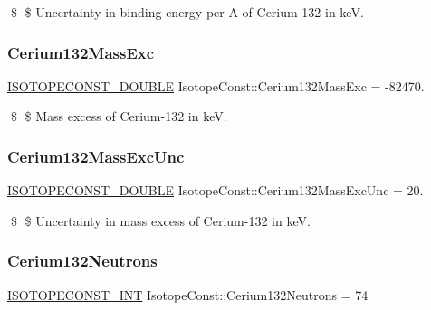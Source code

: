 \$ \$ Uncertainty in binding energy per A of Cerium-\/132 in keV. \mbox{\label{group___isotope_const-_cerium-_ce132_ga4933c0d435a8569534b21c4230b3c50c}} 
\subsubsection{\texorpdfstring{Cerium132\+Mass\+Exc}{Cerium132MassExc}}
{\footnotesize\ttfamily \mbox{\hyperlink{group___isotope_const-_macros_ga8f45a7272ce02c0b4c65c44636ed719a}{I\+S\+O\+T\+O\+P\+E\+C\+O\+N\+S\+T\+\_\+\+D\+O\+U\+B\+LE}} Isotope\+Const\+::\+Cerium132\+Mass\+Exc = -\/82470.}

\$ \$ Mass excess of Cerium-\/132 in keV. \mbox{\label{group___isotope_const-_cerium-_ce132_ga74a15ee3e145c416a19643ae8ef03666}} 
\subsubsection{\texorpdfstring{Cerium132\+Mass\+Exc\+Unc}{Cerium132MassExcUnc}}
{\footnotesize\ttfamily \mbox{\hyperlink{group___isotope_const-_macros_ga8f45a7272ce02c0b4c65c44636ed719a}{I\+S\+O\+T\+O\+P\+E\+C\+O\+N\+S\+T\+\_\+\+D\+O\+U\+B\+LE}} Isotope\+Const\+::\+Cerium132\+Mass\+Exc\+Unc = 20.}

\$ \$ Uncertainty in mass excess of Cerium-\/132 in keV. \mbox{\label{group___isotope_const-_cerium-_ce132_ga13814acc2b7df149434adcceb211e281}} 
\subsubsection{\texorpdfstring{Cerium132\+Neutrons}{Cerium132Neutrons}}
{\footnotesize\ttfamily \mbox{\hyperlink{group___isotope_const-_macros_ga5f18360b3e99483a35c32d789e62621c}{I\+S\+O\+T\+O\+P\+E\+C\+O\+N\+S\+T\+\_\+\+I\+NT}} Isotope\+Const\+::\+Cerium132\+Neutrons = 74}

